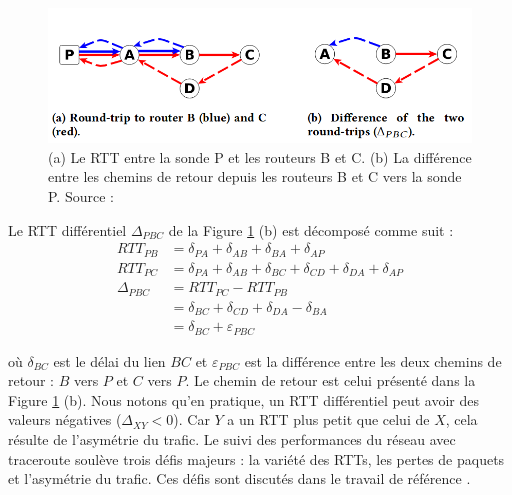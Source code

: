 \begin{figure}[h]
	\centering
	\captionsetup{justification= centering}
	\includegraphics[width=0.7\linewidth]{illustrations/rtt-differ}
	\caption{(a) Le RTT entre la sonde P et les routeurs B et C. (b) La différence entre les  chemins de retour depuis les routeurs B et C vers la sonde P. Source : \cite{DBLP:journals/corr/FontugneAPB16}}
	\label{fig:rtt-differ}
\end{figure} 
Le RTT différentiel $ \Delta_{PBC} $ de la Figure 	\ref{fig:rtt-differ} (b) est décomposé comme suit :
\begin{align}
RTT_{PB} & =  \delta_{PA} + \delta_{AB} + \delta_{BA} + \delta_{AP} \nonumber\\
RTT_{PC} & = \delta_{PA} + \delta_{AB} + \delta_{BC} + \delta_{CD} + \delta_{DA}+ \delta_{AP} \nonumber\\
\Delta_{PBC} & = RTT_{PC} - RTT_{PB}  \label{eq:rttdifference}\\ 
& =  \delta_{BC} + \delta_{CD} + \delta_{DA}- \delta_{BA} \nonumber \\
& = \delta_{BC} + \varepsilon_{PBC} \label{eq:rttdiff}
\end{align}

où $\delta_{BC}$ est le délai du lien $BC$ et $\varepsilon_{PBC}$ est la différence entre les deux chemins de retour : $B$ vers $P$ et $C$ vers $P$.  Le chemin de retour est celui  présenté dans  la Figure \ref{fig:rtt-differ} (b). 
Nous notons qu'en pratique, un RTT différentiel peut avoir des valeurs négatives ($ \Delta_{XY} < 0 $). Car $Y$ a un RTT plus petit que celui de $ X $, cela résulte de l'asymétrie du trafic. 
Le suivi des performances du réseau avec traceroute soulève trois défis majeurs : la variété des RTTs, les pertes de paquets et l'asymétrie du trafic. Ces défis sont discutés dans le travail de référence \cite{DBLP:journals/corr/FontugneAPB16}.



